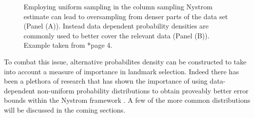 \begin{figure}[h]
{\begin{adjustbox}{width=0.4\textwidth}
        \end{adjustbox}
    }
    \caption{Employing uniform sampling in the column sampling Nystrom estimate can lead to oversampling from denser parts of the data set (Panel (A)). Instead data dependent probability densities are commonly used to better cover the relevant data (Panel (B)). Example taken from \cite{musco2017recursive}*{page 4}.}
    \label{fig: uni-samp-v-nonuni-samp}
\end{figure}

To combat this issue, alternative probabilites density can be constructed to take into account a measure of importance in landmark selection. Indeed there has been a plethora of research that has shown the importance of using data-dependent non-uniform probability distributions to obtain proveably better error bounds within the Nystrom framework \cites{JMLR:v6:drineas05a,DBLP:journals/corr/abs-1303-1849,musco2017recursive,DBLP:journals/corr/abs-1109-3843,DBLP:journals/corr/CohenMM15,kumar2009sampling}. A few of the more common distributions will be discussed in the coming sections.